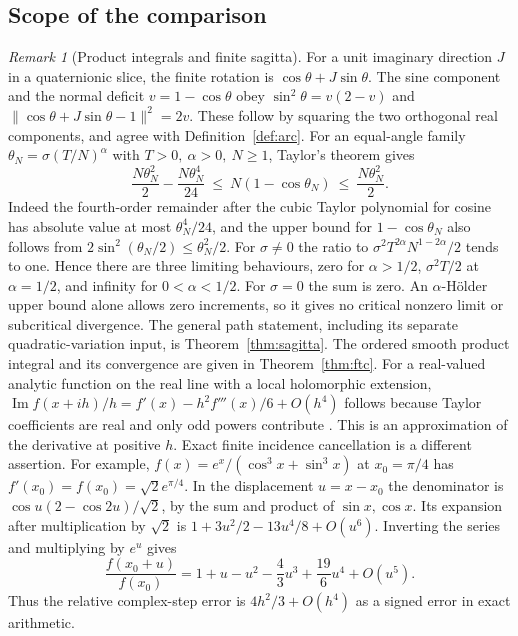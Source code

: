 \documentclass[11pt,reqno]{amsart}
\theoremstyle{definition}
\theoremstyle{remark}
\newtheorem{remark}[theorem]{Remark}
\numberwithin{equation}{section}
\begin{document}
\subsection{Scope of the comparison}

\begin{remark}[Product integrals and finite sagitta]\label{m5:sagitta}
For a unit imaginary direction \(J\) in a quaternionic slice, the
finite rotation is \(\cos\theta+J\sin\theta\).
The sine component and the normal deficit \(v=1-\cos\theta\) obey
\(\sin^2\theta=v(2-v)\) and
\(\lVert\cos\theta+J\sin\theta-1\rVert^2=2v\).
These follow by squaring the two orthogonal real components, and agree
with Definition~\ref{def:arc}. For an equal-angle family
\(\theta_N=\sigma(T/N)^\alpha\) with \(T>0,\ \alpha>0,\ N\geq1\),
Taylor's theorem gives
\[
 \frac{N\theta_N^2}{2}-\frac{N\theta_N^4}{24}
 \ \leq\ N(1-\cos\theta_N)\ \leq\ \frac{N\theta_N^2}{2}.
\]
Indeed the fourth-order remainder after the cubic Taylor polynomial
for cosine has absolute value at most \(\theta_N^4/24\), and the
upper bound for \(1-\cos\theta_N\) also follows from
\(2\sin^2(\theta_N/2)\leq\theta_N^2/2\).
For \(\sigma\ne0\) the ratio to
\(\sigma^2T^{2\alpha}N^{1-2\alpha}/2\) tends to one. Hence there are
three limiting behaviours, zero for \(\alpha>1/2\), \(\sigma^2T/2\)
at \(\alpha=1/2\), and infinity for \(0<\alpha<1/2\). For \(\sigma=0\)
the sum is zero. An \(\alpha\)-Hölder upper bound alone allows zero
increments, so it gives no critical nonzero limit or subcritical
divergence. The general path statement, including its separate
quadratic-variation input, is Theorem~\ref{thm:sagitta}.
The ordered smooth product integral and its convergence are given in
Theorem~\ref{thm:ftc}. For a real-valued analytic function on the
real line with a local holomorphic extension,
\(\operatorname{Im}f(x+ih)/h=f'(x)-h^2 f'''(x)/6+O(h^4)\) follows
because Taylor coefficients are real and only odd powers contribute
\cite{m5:ST}. This is an approximation of the derivative at positive
\(h\). Exact finite incidence cancellation is a different assertion.
For example, \(f(x)=e^x/(\cos^3x+\sin^3x)\) at \(x_0=\pi/4\)
has \(f'(x_0)=f(x_0)=\sqrt2e^{\pi/4}\). In the displacement
\(u=x-x_0\) the denominator is
\(\cos u(2-\cos 2u)/\sqrt2\), by the sum and product of
\(\sin x,\cos x\). Its expansion after multiplication by \(\sqrt2\)
is \(1+3u^2/2-13u^4/8+O(u^6)\). Inverting the series and
multiplying by \(e^u\) gives
\[
\frac{f(x_0+u)}{f(x_0)}=
1+u-u^2-\frac43u^3+\frac{19}{6}u^4+O(u^5).
\]
Thus the relative complex-step error is \(4h^2/3+O(h^4)\)
as a signed error in exact arithmetic.
\end{remark}
\end{document}

